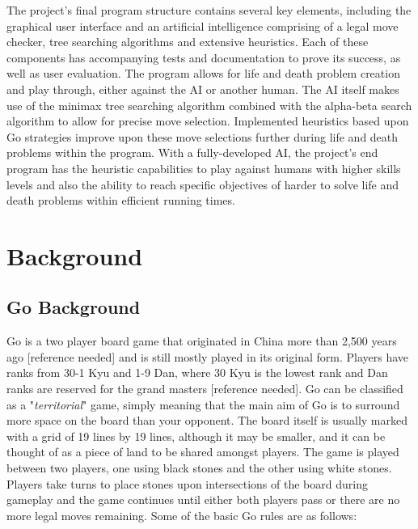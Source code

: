 \documentclass{l3proj}
\begin{document}
The project's final program structure contains several key elements, including the graphical user interface and an artificial intelligence comprising of a legal move checker, tree searching algorithms and extensive heuristics. Each of these components has accompanying tests and documentation to prove its success, as well as user evaluation. The program allows for life and death problem creation and play through, either against the AI or another human. The AI itself makes use of the minimax tree searching algorithm combined with the alpha-beta search algorithm to allow for precise move selection. Implemented heuristics based upon Go strategies improve upon these move selections further during life and death problems within the program. With a fully-developed AI, the project's end program has the heuristic capabilities to play against humans with higher skills levels and also the ability to reach specific objectives of harder to solve life and death problems within efficient running times.

\chapter{Background}
\label{background}

\section{Go Background}

Go is a two player board game that originated in China more than 2,500 years ago [reference needed] and is still mostly played in its original form.  Players have ranks from 30-1 Kyu and 1-9 Dan, where 30 Kyu is the lowest rank and Dan ranks are reserved for the grand masters [reference needed]. Go can be classified as a "\textit{territorial}" game, simply meaning that the main aim of Go is to surround more space on the board than your opponent. The board itself is usually marked with a grid of 19 lines by 19 lines, although it may be smaller, and it can be thought of as a piece of land to be shared amongst players. The game is played between two players, one using black stones and the other using white stones. Players take turns to place stones upon intersections of the board during gameplay and the game continues until either both players pass or there are no more legal moves remaining.  Some of the basic Go rules are as follows:
\end{document}

